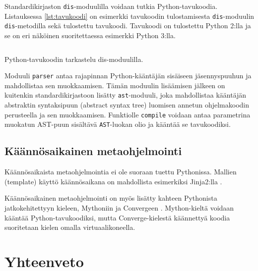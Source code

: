 \documentclass[finnish]{tktltiki2}
\theoremstyle{definition}
\theoremstyle{remark}
\begin{document}
Standardikirjaston \verb|dis|-moduulilla voidaan tutkia Python-tavukoodia. Listauksessa \ref{lst:tavukoodi} on esimerkki tavukoodin tulostamisesta \verb|dis|-moduulin \verb|dis|-metodilla sekä tulostettu tavukoodi. Tavukoodi on tulostettu Python 2:lla ja se on eri näköinen suoritettaessa esimerkki Python 3:lla.


\begin{listing}
    \inputminted[linenos,frame=single,framesep=10pt]{python}{code/tavukoodi.py}
    \caption{Python-tavukoodin tarkastelu dis-moduulilla.}
    \label{lst:tavukoodi}
\end{listing}

Moduuli \verb|parser| antaa rajapinnan Python-kääntäjän sisäiseen jäsennyspuuhun ja mahdollistaa sen muokkaamisen. Tämän moduulin lisäämisen jälkeen on kuitenkin standardikirjastoon lisätty \verb|ast|-moduuli, joka mahdollistaa kääntäjän abstraktin syntaksipuun (abstract syntax tree) luomisen annetun ohjelmakoodin perusteella ja sen muokkaamisen. Funktiolle \verb|compile| voidaan antaa parametrina muokatun AST-puun sisältävä \verb|AST|-luokan olio ja kääntää se tavukoodiksi.





\subsection{Käännösaikainen metaohjelmointi}

Käännösaikaista metaohjelmointia ei ole suoraan tuettu Pythonissa. Mallien (template) käyttö käännösaikana on mahdollista esimerkiksi Jinja2:lla \cite{jinja}.

Käännösaikainen metaohjelmointi on myös lisätty kahteen Pythonista jatkokehitettyyn kieleen, Mythoniin \cite{mython} ja Convergeen \cite{tratt05}. Mython-kieltä voidaan kääntää Python-tavukoodiksi, mutta Converge-kielestä käännettyä koodia suoritetaan kielen omalla virtuaalikoneella.


\section{Yhteenveto}



\pagebreak

%
%
% 
%




\lastpage
\end{document}
